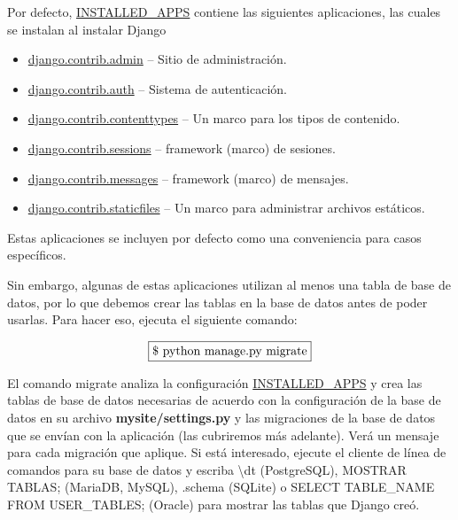 \documentclass[10pt]{article}
\newcommand{\django}[1]{{\textcolor{G}{Django} #1}}
\begin{document}
Por defecto, {\href{https://docs.djangoproject.com/en/3.0/ref/settings/\#std:setting-INSTALLED\_APPS}{INSTALLED\_APPS}} contiene las siguientes aplicaciones, las cuales se instalan al instalar \django{} 

\begin{itemize}
\item {\href{https://docs.djangoproject.com/en/3.0/ref/contrib/admin/\#module-django.contrib.admin}{\textcolor{B}{django.contrib.admin}}} – Sitio de administración.
\item {\href{https://docs.djangoproject.com/en/3.0/topics/auth/\#module-django.contrib.auth}{\textcolor{B}{django.contrib.auth}}} – Sistema de autenticación.
\item {\href{https://docs.djangoproject.com/en/3.0/ref/contrib/contenttypes/\#module-django.contrib.contenttypes}{\textcolor{B}{django.contrib.contenttypes}}} – 
Un marco para los tipos de contenido.
\item {\href{https://docs.djangoproject.com/en/3.0/topics/http/sessions/\#module-django.contrib.sessions}{\textcolor{B}{django.contrib.sessions}}} – framework (marco) de sesiones.
\item {\href{https://docs.djangoproject.com/en/3.0/ref/contrib/messages/\#module-django.contrib.messages}{\textcolor{B}{django.contrib.messages}}} – framework (marco) de mensajes.
\item {\href{https://docs.djangoproject.com/en/3.0/ref/contrib/staticfiles/\#module-django.contrib.staticfiles}{\textcolor	{B}{django.contrib.staticfiles}}} – 
Un marco para administrar archivos estáticos.

\end{itemize}

Estas aplicaciones se incluyen por defecto como una conveniencia para casos específicos.

Sin embargo, algunas de estas aplicaciones utilizan al menos una tabla de base de datos, por lo que debemos crear las tablas en la base de datos antes de poder usarlas. Para hacer eso, ejecuta el siguiente comando:

$$\fbox{\$ python manage.py migrate}$$

El comando migrate analiza la configuración {\href{https://docs.djangoproject.com/en/3.0/ref/settings/\#std:setting-INSTALLED\_APPS}{\textcolor{B}{INSTALLED\_APPS}}} y crea las tablas de base de datos necesarias de acuerdo con la configuración de la base de datos en su archivo \textbf{mysite/settings.py} y las migraciones de la base de datos que se envían con la aplicación (las cubriremos más adelante). Verá un mensaje para cada migración que aplique. Si está interesado, ejecute el cliente de línea de comandos para su base de datos y escriba \textbackslash dt (PostgreSQL), MOSTRAR TABLAS; (MariaDB, MySQL), .schema (SQLite) o SELECT TABLE\_NAME FROM USER\_TABLES; (Oracle) para mostrar las tablas que Django creó.
\end{document}
